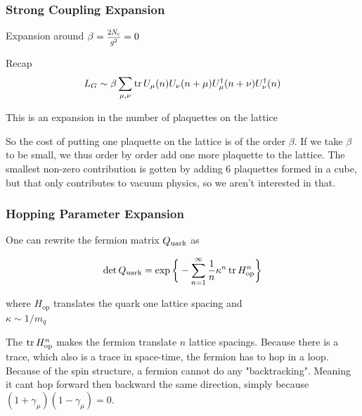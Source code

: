 \documentclass[12pt,a4paper,dvipsnames,usenames]{beamer}
\begin{document}
\begin{frame}
  \frametitle{Strong Coupling Expansion}

  Expansion around $\beta = \scalebox{0.75}{$\displaystyle\frac{2 N_c}{g^2}$} = 0$

  \vspace{2em}

  \begin{grayblock}{Recap}
    \[ L_G \sim \beta\sum_{\mu,\nu} \operatorname{tr} U_{\mu}(n) U_{\nu}(n+\mu) U^{\dagger}_{\mu}(n+\nu) U^{\dagger}_{\nu}(n) \]
  \end{grayblock}

  \vspace{1em}

  This is an expansion in the number of plaquettes on the lattice

  \note
  {
    So the cost of putting one plaquette on the lattice is of the order $\beta$. If we take $\beta$ to be small, we thus order by
    order add one more plaquette to the lattice. The smallest non-zero contribution is gotten by adding 6 plaquettes formed in a
    cube, but that only contributes to vacuum physics, so we aren't interested in that.
  }

\end{frame}

\begin{frame}
  \frametitle{Hopping Parameter Expansion}

  One can rewrite the fermion matrix $Q_{\mathrm{uark}}$ as
  
  \vspace{2em}

  \begin{block}{}
    \[
      \det Q_{\mathrm{uark}} = \exp \bigg\{ - \sum_{n=1}^{\infty} \frac{1}{n} \kappa^n \operatorname{tr} H_{\mathrm{op}}^n \bigg\}
    \]
  \end{block}

  \vspace{1em}

  where $H_{\mathrm{op}}$ translates the quark one lattice spacing and \\ $\kappa \sim 1/m_q$

  \note
  {
    The $\operatorname{tr} H_{\mathrm{op}}^n$ makes the fermion translate $n$ lattice spacings. Because there is a trace, which also is a trace
    in space-time, the fermion has to hop in a loop. Because of the spin structure, a fermion cannot do any "backtracking".
    Meaning it cant hop forward then backward the same direction, simply because $(1 + \gamma_{\mu})(1 - \gamma_{\mu}) = 0$.
  }

\end{frame}
\end{document}
